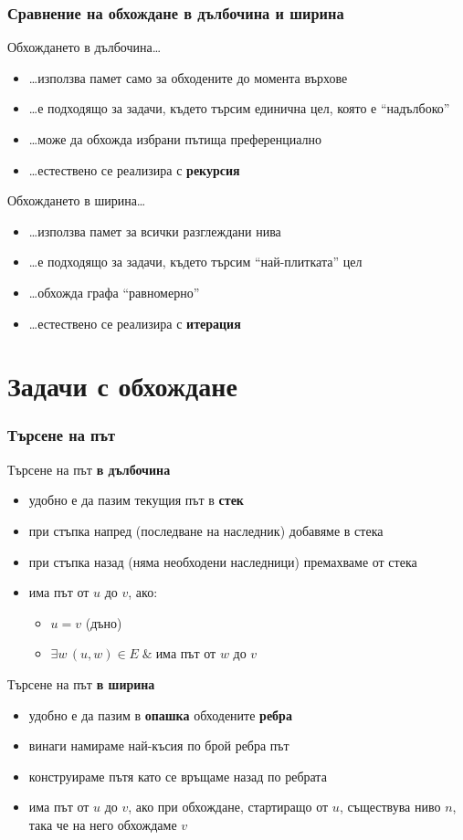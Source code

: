 \documentclass{beamer}
\begin{document}
\begin{frame}
  \frametitle{Сравнение на обхождане в дълбочина и ширина}
  Обхождането в дълбочина\ldots
  \pause
  \begin{itemize}[<+->]
  \item \ldots използва памет само за обходените до момента върхове
  \item \ldots е подходящо за задачи, където търсим единична цел, която е ``надълбоко''
  \item \ldots може да обхожда избрани пътища преференциално
  \item \ldots естествено се реализира с \textbf{рекурсия}
  \end{itemize}
  \onslide<+->
  Обхождането в ширина\ldots
  \begin{itemize}[<+->]
  \item \ldots използва памет за всички разглеждани нива
  \item \ldots е подходящо за задачи, където търсим ``най-плитката'' цел
  \item \ldots обхожда графа ``равномерно''
  \item \ldots естествено се реализира с \textbf{итерация}
  \end{itemize}
\end{frame}

\section{Задачи с обхождане}

\begin{frame}
  \frametitle{Търсене на път}
  Търсене на път \textbf{в дълбочина}
  \pause
  \begin{itemize}[<+->]
  \item удобно е да пазим текущия път в \textbf{стек}
  \item при стъпка напред (последване на наследник) добавяме в стека
  \item при стъпка назад (няма необходени наследници) премахваме от стека
  \item има път от $u$ до $v$, ако:
    \begin{itemize}
    \item $u = v$ (дъно)
    \item $\exists w\, (u,w)\in E\;\&\;$има път от $w$ до $v$
    \end{itemize}
  \end{itemize}
  \onslide<+->
  Търсене на път \textbf{в ширина}
  \begin{itemize}[<+->]
  \item удобно е да пазим в \textbf{опашка} обходените \textbf{ребра}
  \item винаги намираме най-късия по брой ребра път
  \item конструираме пътя като се връщаме назад по ребрата
  \item има път от $u$ до $v$, ако при обхождане, стартиращо от $u$, съществува  ниво $n$, така че на него обхождаме $v$
  \end{itemize}
\end{frame}
\end{document}

